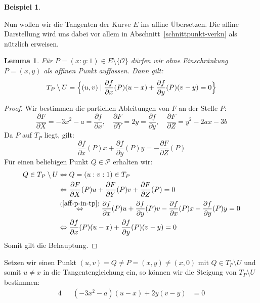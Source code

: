 \documentclass[hidelinks]{article}
\theoremstyle{plain}
\newtheorem{lem}[thm]{Lemma}
\theoremstyle{definition}
\newtheorem{bsp}[thm]{Beispiel}
\theoremstyle{rem}
\newcommand{\patinf}{\mathcal{O}}
\begin{document}
\begin{sloppypar}
\begin{bsp}
\end{bsp}
Nun wollen wir die Tangenten der Kurve $E$ ins affine Übersetzen. Die affine Darstellung wird uns dabei vor allem in Abschnitt~\ref{schnittpunkt-verkn} als nützlich erweisen.
\begin{lem}\label{aff-tang}
    Für $P=(x:y:1)\in E\setminus\{\patinf\}$ dürfen wir ohne Einschränkung $P=(x,y)$ als affinen Punkt auffassen. Dann gilt:
    \begin{equation*}
        T_P\setminus U =\Bigl\{(u,v)\mid \frac{\partial f}{\partial x}(P)(u-x)+\frac{\partial f}{\partial y}(P)(v-y)=0\Bigr\}
    \end{equation*}
\end{lem}
\begin{proof}
    Wir bestimmen die partiellen Ableitungen von $F$ an der Stelle $P$:
    \begin{equation*}
        \frac{\partial F}{\partial X}=-3x^2-a=\frac{\partial f}{\partial x},\quad \frac{\partial F}{\partial Y}=2y=\frac{\partial f}{\partial y},\quad \frac{\partial F}{\partial Z}=y^2-2ax-3b
    \end{equation*}
    Da $P$ auf $T_P$ liegt, gilt:
    \begin{equation}\label{aff-p-in-tp}
        \frac{\partial f}{\partial x}(P)x+\frac{\partial f}{\partial y}(P)y=-\frac{\partial F}{\partial Z}(P)
    \end{equation}
    Für einen beliebigen Punkt $Q\in\mathcal{P}$ erhalten wir:
    \begin{align*}
        Q\in T_P\setminus U & \Leftrightarrow Q=(u:v:1)\in T_P\\
        & \Leftrightarrow \frac{\partial F}{\partial X}(P)u+\frac{\partial F}{\partial Y}(P)v+\frac{\partial F}{\partial Z}(P)=0\\
        & \stackrel{(\ref{aff-p-in-tp})}{\Leftrightarrow} \frac{\partial f}{\partial x}(P)u+\frac{\partial f}{\partial y}(P)v-\frac{\partial f}{\partial x}(P)x-\frac{\partial f}{\partial y}(P)y=0\\
        & \Leftrightarrow \frac{\partial f}{\partial x}(P)(u-x)+\frac{\partial f}{\partial y}(P)(v-y)=0
    \end{align*}
    Somit gilt die Behauptung.
\end{proof}
Setzen wir einen Punkt $(u,v)=Q\ne P=(x,y)\ne(x,0)$ mit $Q\in T_P\setminus U$ und somit $u\ne x$ in die Tangentengleichung ein, so können wir die Steigung von $T_P\setminus U$ bestimmen:
\begin{alignat*}{4}
    &&(-3x^2-a)(u-x)+2y(v-y)&=0\\

\end{alignat*}
\end{sloppypar}
\end{document}

